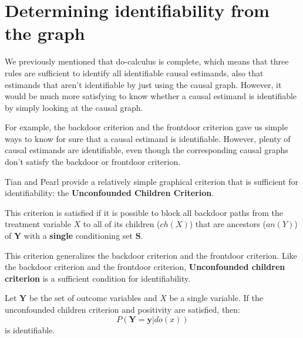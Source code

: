 \section{Determining identifiability from the graph}
We previously mentioned that do-calculus is complete, which means that three rules
are sufficient to identify all identifiable causal estimands, also that estimands
that aren't identifiable by just using the causal graph. However, it would be
much more satisfying to know whether a causal estimand is identifiable by simply
looking at the causal graph.

For example, the backdoor criterion and the frontdoor criterion gave us simple
ways to know for sure that a causal estimand is identifiable. However, plenty of
causal estimands are identifiable, even though the corresponding
causal graphs don't satisfy the backdoor or frontdoor criterion.

Tian and Pearl provide a relatively simple graphical criterion that is sufficient
for identifiability: the \textbf{Unconfounded Children Criterion}.

\begin{definition}
    This criterion is satisfied if it is possible to block all backdoor paths
    from the treatment variable $X$ to all of its children ($ch(X)$) that are
    ancestors ($an(Y)$) of $\mathbf{Y}$ with a \textbf{single} conditioning set $\mathbf{S}$.
\end{definition}

This criterion generalizes the backdoor criterion and the frontdoor criterion.
Like the backdoor criterion and the frontdoor criterion, \textbf{Unconfounded children
    criterion} is a sufficient condition for identifiability.

\begin{definition}
    Let $\mathbf{Y}$ be the set of outcome variables and $X$ be a single variable.
    If the unconfounded children criterion and positivity are satisfied, then:
    \begin{equation}
        P(\mathbf{Y} = \mathbf{y} |do(x))
    \end{equation}
    is identifiable.
\end{definition}

